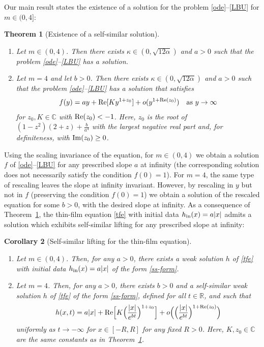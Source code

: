 \documentclass{article}%
\renewcommand{\Re}{{\rm Re}}
\renewcommand{\Im}{{\rm Im}}
\newtheorem{theorem}{Theorem}[section]
\newtheorem{corollary}[theorem]{Corollary} %
\newcommand{\R}{\mathbb{R}}
\newcommand{\C}{\mathbb{C}}
\begin{document}
Our main result states the existence of a solution for the problem \eqref{ode}--\eqref{LBU} for $m \in(0,4]$:
\begin{theorem}[Existence of a self-similar solution] \label{thm-lifting}
  \text{} %
  \begin{enumerate}
  \item  Let $m \in (0,4)$. Then there exists $\kappa\in (0,\sqrt{12\alpha})$ and $a>0$ such that 
the problem \eqref{ode}--\eqref{LBU} has a solution.
  \item Let $m = 4$ and let $b > 0$. Then there exists $\kappa\in (0,\sqrt{12\alpha})$ and $a>0$ 
such that the problem \eqref{ode}--\eqref{LBU} has a solution that satisfies
    \begin{align}
      f(y) = ay +  \Re [K y^{1+z_0}] + o(y^{1+\Re( z_0)}) &&\text{as $y \to \infty$}
    \end{align}
    for $z_0, K \in \C$ with $\Re( z_0) < -1$. Here, $z_0$ is the root of
    $(1-z^2)(2+z) + \frac{b}{a^4}$ with the largest negative real part and, for definiteness, with $\Im(z_0)\geq 0$.%
  \end{enumerate}
\end{theorem}
Using the scaling invariance of the equation, for $m \in (0,4)$ we obtain a
solution $f$ of \eqref{ode}--\eqref{LBU} for any prescribed slope $a$ at
infinity (the corresponding solution does not necessarily satisfy the condition
$f(0) = 1$). For $m = 4$, the same type of rescaling leaves the slope at
infinity invariant. However, by rescaling in $y$ but not in $f$ (preserving the
condition $f(0) = 1$) we obtain a solution of the rescaled equation for some $b > 0$,
 with the desired slope at infinity. As a consequence of
Theorem~\ref{thm-lifting}, the thin-film equation \eqref{tfe} with initial data
$h_{\rm in} (x)= a|x|$ admits a solution which exhibits self-similar lifting for
any prescribed slope at infinity:
\begin{corollary}[Self-similar lifting for the thin-film equation] \label{cor-lifting} \text{}%
  \begin{enumerate}
  \item Let $m \in (0,4)$. Then, for any $a>0$, there exists a weak solution $h$ of \eqref{tfe} 
with initial data $h_{\rm in}(x)=a|x|$ of the form \eqref{ss-form}.
  \item Let $m = 4$. Then, for any $a>0$, there exists $b > 0$ and a self-similar
    weak solution $h$ of \eqref{tfe} of the form \eqref{ss-form}, defined for
    all $t \in \R$, and such that
  \begin{align*}
    h(x,t) =  a|x| + \Re \Big[K \Big(\frac{|x|}{e^{bt}} \Big)^{1+z_0}\Big]  + o\Big(\Big(\frac{|x|}{e^{bt}} \Big)^{1 + \Re( z_0)} \Big)
  \end{align*}
  uniformly as $t \to - \infty$ for $x \in [-R,R]$ for any fixed $R >0$. 
Here, $K, z_0 \in \C$ are the same constants as in Theorem~\ref{thm-lifting}.
  \end{enumerate}
\end{corollary}
\end{document}
